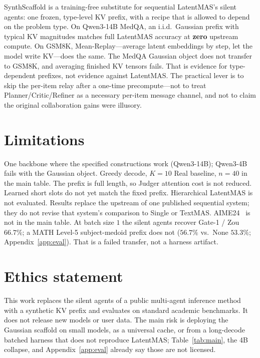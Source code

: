 \documentclass[11pt]{article}
\begin{document}
SynthScaffold is a training-free substitute for sequential LatentMAS's
silent agents: one frozen, type-level KV prefix, with a recipe that is
allowed to depend on the problem type.
On Qwen3-14B MedQA, an i.i.d.\ Gaussian prefix with typical KV
magnitudes matches full LatentMAS accuracy at \textbf{zero} upstream
compute.
On GSM8K, Mean-Replay---average latent embeddings by step, let the
model write KV---does the same.
The MedQA Gaussian object does not transfer to GSM8K, and averaging
finished KV tensors fails.
That is evidence for type-dependent prefixes, not evidence against
LatentMAS.
The practical lever is to skip the per-item relay after a one-time
precompute---not to treat Planner/Critic/Refiner as a necessary
per-item message channel, and not to claim the original collaboration
gains were illusory.

\section*{Limitations}
One backbone where the specified constructions work (Qwen3-14B);
Qwen3-4B fails with the Gaussian object.
Greedy decode, $K{=}10$ Real baseline, $n{=}40$ in the main table.
The prefix is full length, so Judger attention cost is not reduced.
Learned short slots do not yet match the fixed prefix.
Hierarchical LatentMAS is not evaluated.
Results replace the upstream of one published sequential system; they
do not revise that system's comparison to Single or TextMAS.
AIME24~\citep{aime2024} is not in the main table.
At batch size $1$ the silent agents recover Gate-1 / Zou $66.7\%$; a
MATH Level-5 subject-medoid prefix does not ($56.7\%$ vs.\ None $53.3\%$;
Appendix~\ref{app:eval}).
That is a failed transfer, not a harness artifact.

\section*{Ethics statement}
This work replaces the silent agents of a public multi-agent inference
method with a synthetic KV prefix and evaluates on standard academic
benchmarks.
It does not release new models or user data.
The main risk is deploying the Gaussian scaffold on small models, as a
universal cache, or from a long-decode batched harness that does not
reproduce LatentMAS; Table~\ref{tab:main}, the 4B collapse, and
Appendix~\ref{app:eval} already say those are not licensed.



\appendix
\end{document}
